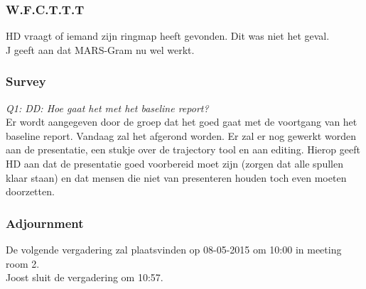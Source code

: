 \subsubsection{W.F.C.T.T.T}
HD vraagt of iemand zijn ringmap heeft gevonden. Dit was niet het geval.\\

J geeft aan dat MARS-Gram nu wel werkt.\\ 
\subsubsection{Survey}
\textit{Q1: DD: Hoe gaat het met het baseline report?}\\
Er wordt aangegeven door de groep dat het goed gaat met de voortgang van het baseline report. Vandaag zal het afgerond worden. Er zal er nog gewerkt worden aan de presentatie, een stukje over de trajectory tool en aan editing. Hierop  geeft HD aan dat de presentatie goed voorbereid moet zijn (zorgen dat alle spullen klaar staan) en dat mensen die niet van presenteren houden toch even moeten doorzetten.\\

\subsubsection{Adjournment}
De volgende vergadering zal plaatsvinden op 08-05-2015 om 10:00 in meeting room 2.\\

Joost sluit de vergadering om 10:57.\\

